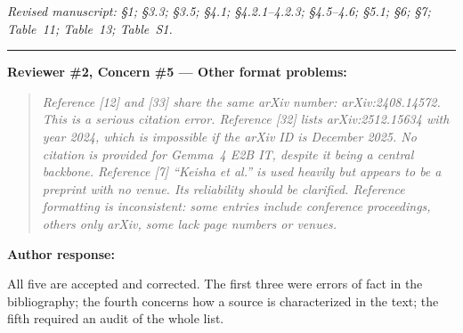 \documentclass[11pt,a4paper]{article}
\newcommand{\rconcern}[3]{%
  \bigskip\noindent\rule{\linewidth}{0.4pt}\par\medskip
  \noindent\textbf{\textcolor{rccolor}{#1 --- #2:}}\par
  \smallskip
  \begin{quote}\itshape\textcolor{rccolor}{#3}\end{quote}%
}
\newcommand{\arhead}[1]{\medskip\noindent\textbf{#1}\par\smallskip}
\newcommand{\msloc}[1]{%
  \smallskip\noindent\textit{Revised manuscript: #1}\par%
}
\begin{document}
\msloc{\S1; \S3.3; \S3.5; \S4.1; \S4.2.1--4.2.3; \S4.5--4.6; \S5.1; \S6; \S7; Table~11; Table~13; Table~S1.}

\rconcern{Reviewer \#2, Concern \#5}{Other format problems}{Reference
[12] and [33] share the same arXiv number: arXiv:2408.14572. This is a
serious citation error. Reference [32] lists arXiv:2512.15634 with year
2024, which is impossible if the arXiv ID is December 2025. No citation
is provided for Gemma~4 E2B IT, despite it being a central backbone.
Reference [7] ``Keisha et al.'' is used heavily but appears to be a
preprint with no venue. Its reliability should be clarified. Reference
formatting is inconsistent: some entries include conference proceedings,
others only arXiv, some lack page numbers or venues.}

\arhead{Author response:}

All five are accepted and corrected. The first three were errors of fact
in the bibliography; the fourth concerns how a source is characterized in
the text; the fifth required an audit of the whole list.
\end{document}
